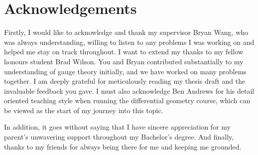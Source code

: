 
\chapter*{Acknowledgements}\label{acknowledgements}

Firstly, I would like to acknowledge and thank my supervisor Bryan Wang, who was 
always understanding, willing to listen to any problems I was working on and helped me
stay on track throughout. I want to extend my thanks to my fellow
honours student Brad Wilson. You and Bryan contributed substantially to my 
understanding of gauge theory initially, and we have worked on many problems 
together. I am deeply grateful for meticulously reading my thesis draft and the 
invaluable feedback you gave. I must also acknowledge Ben Andrews for his
detail oriented teaching style when running the differential geometry course, 
which can be viewed as the start of my journey into this topic. 

In addition, it goes without saying that I have sincere appreciation for my 
parent's unwavering support throughout my Bachelor's 
degree. And finally, thanks to my friends for always being there for me and
keeping me grounded. 
